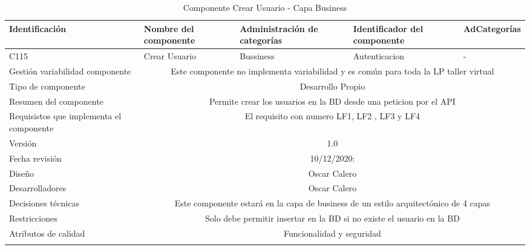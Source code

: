 \documentclass[10pt,a4paper,openany]{book}
\begin{document}
\begin{longtable}{|p{3cm}|p{3cm}|p{3cm}|p{3cm}|p{3cm}|} \hline
Identificación & Nombre del componente & Administración de categorías & Identificador del componente & AdCategorías \\[0.5ex] \hline
C115& Crear Usuario& Bussiness& Autenticacion& -\\[0.5ex] \hline
Gestión variabilidad componente & \multicolumn{4}{|c|}{Este componente no implementa variabilidad y es común para toda la LP taller virtual} \\ \hline
Tipo de componente & \multicolumn{4}{|c|}{Desarrollo Propio} \\ \hline
Resumen del componente & \multicolumn{4}{|c|}{Permite crear los usuarios en la BD desde una peticion por el API} \\ \hline
Requisistos que implementa el componente & \multicolumn{4}{|c|}{El requisito con numero LF1, LF2 , LF3 y LF4 } \\ \hline
Versión & \multicolumn{4}{|c|}{1.0 } \\ \hline
Fecha revisión & \multicolumn{4}{|c|}{ 10/12/2020:} \\ \hline
Diseño & \multicolumn{4}{|c|}{Oscar Calero} \\ \hline
Desarrolladores & \multicolumn{4}{|c|}{Oscar Calero} \\ \hline
Decisiones técnicas & \multicolumn{4}{|c|}{Este componente estará en la capa de business de un estilo arquitectónico de 4 capas  } \\ \hline
Restricciones & \multicolumn{4}{|c|}{Solo debe permitir insertar en la BD si no existe el usuario en la BD} \\ \hline
Atributos de calidad & \multicolumn{4}{|c|}{Funcionalidad y seguridad} \\ \hline
\caption{Componente Crear Usuario - Capa Business}
\label{table:t6}
\end{longtable}
\end{document}
